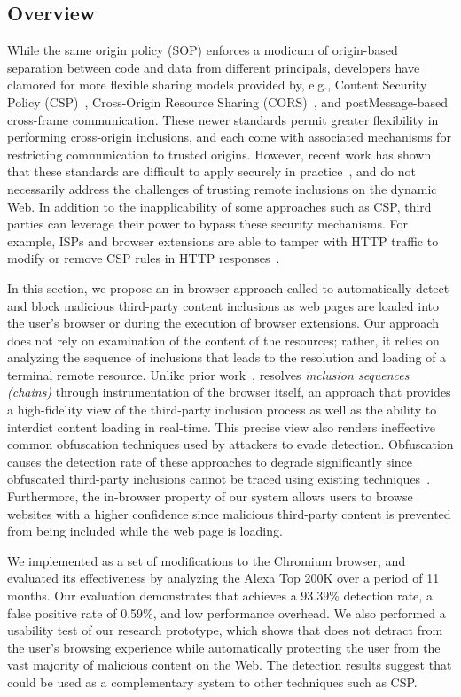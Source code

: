 \subsection{Overview}
\label{inclusion:sec:overview}

While the same origin policy (SOP) enforces a modicum of origin-based separation
between code and data from different principals, developers have clamored for
more flexible sharing models provided by, e.g., Content Security Policy
(CSP)~\cite{csp_spec}, Cross-Origin Resource Sharing (CORS)~\cite{cors_spec},
and postMessage-based cross-frame communication. These newer standards permit
greater flexibility in performing cross-origin inclusions, and each come with
associated mechanisms for restricting communication to trusted origins. However,
recent work has shown that these standards are difficult to apply securely in
practice~\cite{ndss2013postman,raid2014csp}, and do not necessarily address the
challenges of trusting remote inclusions on the dynamic Web. In addition to the
inapplicability of some approaches such as CSP, third parties can leverage their
power to bypass these security mechanisms. For example, ISPs and browser
extensions are able to tamper with HTTP traffic to modify or remove CSP rules in
HTTP responses~\cite{usenixsec2015webeval,sp2015adinjection}.

In this section, we propose an in-browser approach called \excision to
automatically detect and block malicious third-party content inclusions as web
pages are loaded into the user's browser or during the execution of browser
extensions. Our approach does not rely on examination of the content of the
resources; rather, it relies on analyzing the sequence of inclusions that leads
to the resolution and loading of a terminal remote resource. Unlike prior
work~\cite{ccs2012madtracer}, \excision resolves \emph{inclusion sequences
(chains)} through instrumentation of the browser itself, an approach that
provides a high-fidelity view of the third-party inclusion process as well as
the ability to interdict content loading in real-time. This precise view also
renders ineffective common obfuscation techniques used by attackers to evade
detection. Obfuscation causes the detection rate of these approaches to degrade
significantly since obfuscated third-party inclusions cannot be traced using
existing techniques~\cite{ccs2012madtracer}. Furthermore, the in-browser
property of our system allows users to browse websites with a higher confidence
since malicious third-party content is prevented from being included while the
web page is loading.

We implemented \excision as a set of modifications to the Chromium browser, and
evaluated its effectiveness by analyzing the Alexa Top 200K over a period of 11
months. Our evaluation demonstrates that \excision achieves a 93.39\% detection
rate, a false positive rate of 0.59\%, and low performance overhead. We also
performed a usability test of our research prototype, which shows that \excision
does not detract from the user's browsing experience while automatically
protecting the user from the vast majority of malicious content on the Web. The
detection results suggest that \excision could be used as a complementary system
to other techniques such as CSP.
